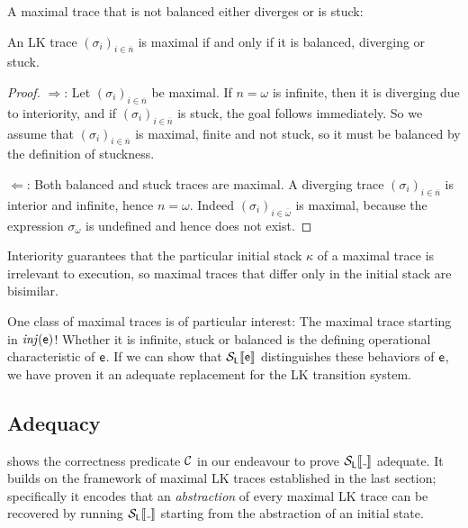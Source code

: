 A maximal trace that is not balanced either diverges or is stuck:

\begin{lemmarep}
  An LK trace $(σ_i)_{i∈\overline{n}}$ is maximal if and only if it is balanced,
  diverging or stuck.
\end{lemmarep}
\begin{proof}
  $\Rightarrow$: Let $(σ_i)_{i∈\overline{n}}$ be maximal.
  If $n=ω$ is infinite, then it is diverging due to interiority, and if
  $(σ_i)_{i∈\overline{n}}$ is stuck, the goal follows immediately.
  So we assume that $(σ_i)_{i∈\overline{n}}$ is maximal, finite and not stuck,
  so it must be balanced by the definition of stuckness.

  $\Leftarrow$: Both balanced and stuck traces are maximal.
  A diverging trace $(σ_i)_{i∈\overline{n}}$ is interior and infinite,
  hence $n=ω$.
  Indeed $(σ_i)_{i∈\overline{ω}}$ is maximal, because the expression $σ_ω$
  is undefined and hence does not exist.
\end{proof}

Interiority guarantees that the particular initial stack $κ$ of a maximal trace
is irrelevant to execution, so maximal traces that differ only in the initial
stack are bisimilar.

One class of maximal traces is of particular interest:
The maximal trace starting in $\mathit{inj}(\mathsf{e})$!
Whether it is infinite, stuck or balanced is the defining operational
characteristic of $\mathsf{e}$.
If we can show that $\mathcal{S}_{\mathop{\mathsf{L}}}\llbracket {\mathsf{e}} \rrbracket$ distinguishes these behaviors of $\mathsf{e}$, we
have proven it an adequate replacement for the LK transition system.

\subsection{Adequacy}

 shows the correctness predicate $\mathcal{C}$ in
our endeavour to prove $\semvan{\wild}$ adequate.
It builds on the framework of maximal LK traces established in the last section;
specifically it encodes that an \emph{abstraction} of every maximal LK trace can be
recovered by running $\semvan{\wild}$ starting from the abstraction of an initial
state.

